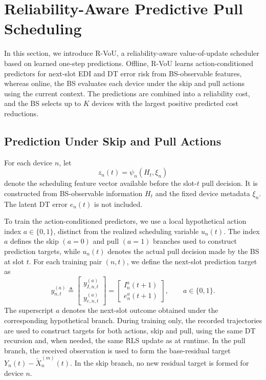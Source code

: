 \documentclass[conference]{IEEEtran}
\begin{document}
\section{Reliability-Aware Predictive Pull Scheduling}
\label{sec:scheduling}
\vspace{-0.2mm}
In this section, we introduce R-VoU, a reliability-aware value-of-update
scheduler based on learned one-step predictions. Offline, R-VoU learns
action-conditioned predictors for next-slot EDI and DT error risk from
BS-observable features, whereas online, the BS evaluates each device under
the skip and pull actions using the current context. The predictions are
combined into a reliability cost, and the BS selects up to \(K\) devices with
the largest positive predicted cost reductions.
\vspace{-0.9mm}
\subsection{Prediction Under Skip and Pull Actions}
\vspace{-0.50mm}
\noindent
For each device \(n\), let
\vspace{-1.30mm}
\begin{equation}
\label{eq:rvou_feature_vector}
z_n(t)=\psi_n(H_t,\xi_n)
\end{equation}
denote the scheduling feature vector available before the slot-\(t\)
pull decision. It is constructed from BS-observable information \(H_t\) and
the fixed device metadata \(\xi_n\). The latent DT error \(e_n(t)\) is not included.

To train the action-conditioned predictors, we use a local hypothetical action
index \(a\in\{0,1\}\), distinct from the realized scheduling variable
\(u_n(t)\). The index \(a\) defines the skip \((a=0)\) and pull \((a=1)\)
branches used to construct prediction targets, while \(u_n(t)\) denotes the
actual pull decision made by the BS at slot \(t\). For each training pair \((n,t)\), we define the next-slot prediction target as
\vspace{-0.1mm}
\begin{equation}
\label{eq:rvou_targets}
y_{n,t}^{(a)}
\triangleq
\begin{bmatrix}
y_{I,n,t}^{(a)}\\
y_{e,n,t}^{(a)}
\end{bmatrix}
=
\begin{bmatrix}
I_n^a(t+1)\\
e_n^a(t+1)
\end{bmatrix},
\qquad a\in\{0,1\}.
\end{equation}
The superscript \(a\) denotes the next-slot outcome obtained under the
corresponding hypothetical branch.  During training only, the recorded
trajectories are used to construct targets for both actions, skip and pull,
using the same DT recursion and, when needed, the same RLS update as at
runtime. In the pull branch, the received observation is used to form the
base-residual target \(Y_n(t)-\tilde X_n^{(m)}(t)\). In the skip branch, no new
residual target is formed for device \(n\).
\end{document}
